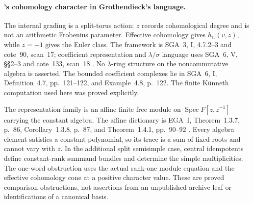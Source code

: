 \paragraph{'s cohomology character in Grothendieck's language.}
The internal grading is a split-torus action; \(z\) records
cohomological degree and is not an arithmetic Frobenius parameter.
Effective cohomology gives \(h_C(v,z)\), while \(z=-1\)
gives the Euler class.
The framework is SGA~3, I, 4.7.2--3 and cote~90, scan~17;
coefficient representation and \(\lambda/\sigma\) language
uses SGA~6, V, \S\S2--3 and cote~133, scan~18
\cite{SGA3,SGA6,Archive}.
No \(\lambda\)-ring structure on the noncommutative algebra
is asserted.
The bounded coefficient complexes lie in SGA~6, I,
Definition~4.7, pp.~121--122, and Example~4.8, p.~122.
The finite K\"unneth computation used here was proved explicitly.

The representation family is an affine finite free module on
\(\operatorname{Spec}F[z,z^{-1}]\) carrying the constant algebra.
The affine dictionary is EGA~I, Theorem~1.3.7, p.~86,
Corollary~1.3.8, p.~87, and Theorem~1.4.1, pp.~90--92
\cite{EGA}.
Every algebra element satisfies a constant polynomial, so its
trace is a sum of fixed roots and cannot vary with \(z\).
In the additional split semisimple case, central idempotents
define constant-rank summand bundles and determine the simple
multiplicities.
The one-word obstruction uses the actual rank-one module equation
and the effective cohomology cone at a positive character value.
These are proved comparison obstructions, not assertions from an
unpublished archive leaf or identifications of a canonical basis.
